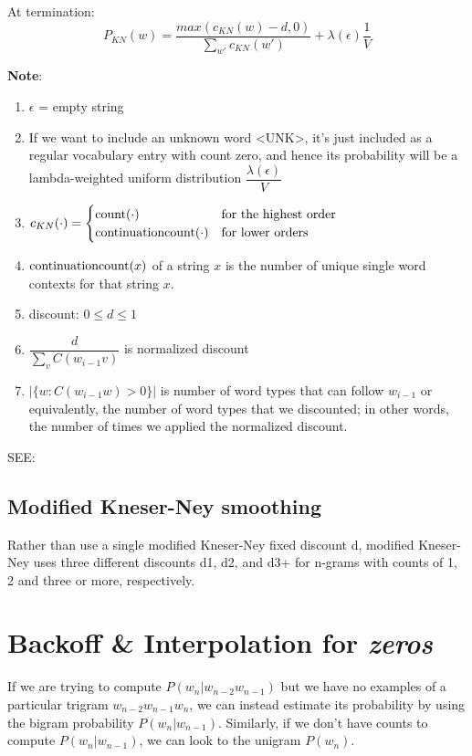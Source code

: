 At termination:
\[
    P_{KN}(w) = \displaystyle\dfrac{max(c_{KN}(w)-d,0)}{\sum_{w'} c_{KN}(w')} + \lambda(\epsilon)\displaystyle\dfrac{1}{V}
\]

\textbf{Note}:

\begin{enumerate}[itemsep=0.1cm]
    \item $\epsilon$ = empty string
    \item If we want to include an unknown word <UNK>, it’s just included as a regular vocabulary entry with count zero, and hence its probability will be a lambda-weighted uniform distribution \(\displaystyle\dfrac{\lambda(\epsilon)}{V}\)
    \item \(c_{KN}(\cdot) = \begin{cases}
        \operatorname{count}(\cdot) & \text{for the highest order} \\
        \operatorname{continuationcount}(\cdot) & \text{for lower orders}
    \end{cases}\)
    \item $\operatorname{continuationcount}(x)$ of a string $x$ is the number of unique single word contexts for that string $x$.
    \item discount: $0 \leq d \leq 1$ 
    \item \(\displaystyle\dfrac{d}{\sum_v C(w_{i-1}v)}\) is normalized discount
    \item \(|\{w : C(w_{i-1}w) > 0\}|\) is number of word types that can follow $w_{i-1}$ or equivalently, the number of word types that we discounted; in other words, the number of times we applied the normalized discount.
\end{enumerate}

\vspace{0.2cm}

SEE: 

\subsection{Modified Kneser-Ney smoothing}
Rather than use a single modified
Kneser-Ney fixed discount d, modified Kneser-Ney uses three different discounts d1, d2, and d3+ for n-grams with counts of 1, 2 and three or more, respectively.

\section{Backoff \& Interpolation for \textit{zeros} \cite{nlp-1}}
If we are trying to compute $P(w_n|w_{n-2}w_{n-1})$ but we have no examples of a particular trigram $w_{n-2}w_{n-1}w_n$, we can instead estimate its probability by using the bigram probability $P(w_n|w_{n-1})$. Similarly, if we don’t have counts to compute $P(w_n|w_{n-1})$, we can look to the unigram $P(w_n)$.

